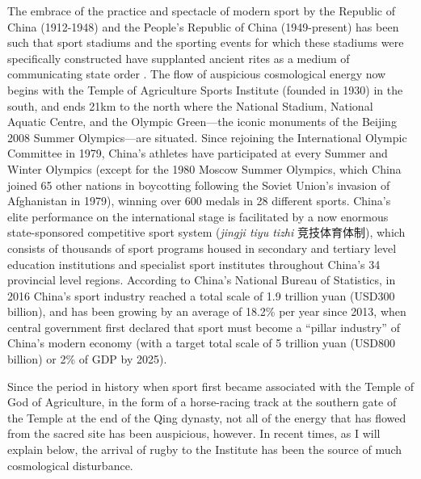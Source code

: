 The embrace of the practice and spectacle of modern sport by the Republic of China (1912-1948) and the People's Republic of China (1949-present) has been such that
sport stadiums and the sporting events for which these stadiums were specifically constructed have supplanted ancient rites as a medium of communicating state order \citep{Brownell1995}.  The flow of auspicious cosmological energy now begins with the Temple of Agriculture Sports Institute (founded in 1930) in the south, and ends 21km to the north where the National Stadium, National Aquatic Centre, and the Olympic Green---the iconic monuments of the Beijing 2008 Summer Olympics---are situated.  Since rejoining the International Olympic Committee in 1979, China's athletes have participated at every Summer and Winter Olympics (except for the 1980 Moscow Summer Olympics, which China joined 65 other nations in boycotting following the Soviet Union's invasion of Afghanistan in 1979), winning over 600 medals in 28 different sports.  China's elite performance on the international stage is facilitated by a now enormous state-sponsored competitive sport system (\textit{jingji tiyu tizhi} 竞技体育体制), which consists of thousands of sport programs housed in secondary and tertiary level education institutions and specialist sport institutes throughout China's 34 provincial level regions.  According to China's National Bureau of Statistics, in 2016 China's sport industry reached a total scale of 1.9 trillion yuan (USD300 billion), and has been growing by an average of 18.2\% per year since 2013, when central government first declared that sport must become a ``pillar industry'' of China's modern economy (with a target total scale of 5 trillion yuan (USD800 billion) or 2\% of GDP by 2025).

Since the period in history when sport first became associated with the Temple of God of Agriculture, in the form of a horse-racing track at the southern gate of the Temple at the end of the Qing dynasty, not all of the energy that has flowed from the sacred site has been auspicious, however. In recent times, as I will explain below, the arrival of rugby to the Institute has been the source of much cosmological disturbance.



